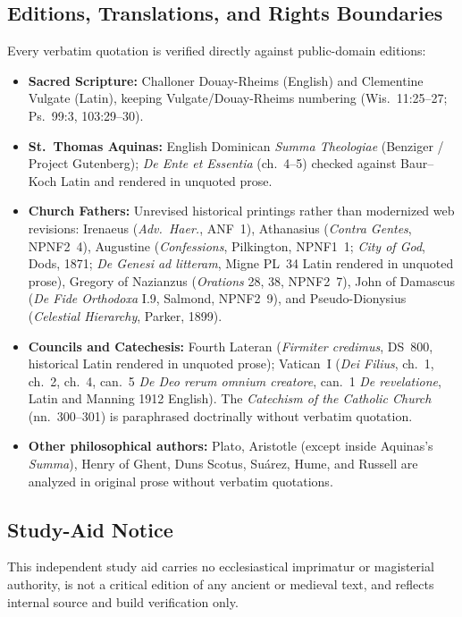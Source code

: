 \subsection*{Editions, Translations, and Rights Boundaries}

Every verbatim quotation is verified directly against public-domain editions:

\begin{itemize}
\item \textbf{Sacred Scripture:} Challoner Douay-Rheims (English) and Clementine Vulgate (Latin), keeping Vulgate/Douay-Rheims numbering (Wis.~11:25--27; Ps.~99:3, 103:29--30).
\item \textbf{St.\ Thomas Aquinas:} English Dominican \emph{Summa Theologiae} (Benziger / Project Gutenberg); \emph{De Ente et Essentia} (ch.~4--5) checked against Baur--Koch Latin and rendered in unquoted prose.
\item \textbf{Church Fathers:} Unrevised historical printings rather than modernized web revisions: Irenaeus (\emph{Adv.\ Haer.}, ANF~1), Athanasius (\emph{Contra Gentes}, NPNF2~4), Augustine (\emph{Confessions}, Pilkington, NPNF1~1; \emph{City of God}, Dods, 1871; \emph{De Genesi ad litteram}, Migne PL~34 Latin rendered in unquoted prose), Gregory of Nazianzus (\emph{Orations} 28, 38, NPNF2~7), John of Damascus (\emph{De Fide Orthodoxa} I.9, Salmond, NPNF2~9), and Pseudo-Dionysius (\emph{Celestial Hierarchy}, Parker, 1899).
\item \textbf{Councils and Catechesis:} Fourth Lateran (\emph{Firmiter credimus}, DS~800, historical Latin rendered in unquoted prose); Vatican~I (\emph{Dei Filius}, ch.~1, ch.~2, ch.~4, can.~5 \emph{De Deo rerum omnium creatore}, can.~1 \emph{De revelatione}, Latin and Manning 1912 English). The \emph{Catechism of the Catholic Church} (nn.~300--301) is paraphrased doctrinally without verbatim quotation.
\item \textbf{Other philosophical authors:} Plato, Aristotle (except inside Aquinas's \emph{Summa}), Henry of Ghent, Duns Scotus, Su\'{a}rez, Hume, and Russell are analyzed in original prose without verbatim quotations.
\end{itemize}

\subsection*{Study-Aid Notice}

This independent study aid carries no ecclesiastical imprimatur or magisterial authority, is not a critical edition of any ancient or medieval text, and reflects internal source and build verification only.

